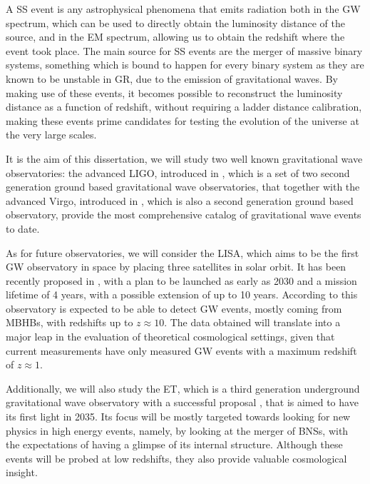 A \gls{SS} event is any astrophysical phenomena that emits radiation both in the \gls{GW} spectrum, which can be used to directly obtain the luminosity distance of the source, and in the \gls{EM} spectrum, allowing us to obtain the redshift where the event took place. The main source for \gls{SS} events are the merger of massive binary systems, something which is bound to happen for every binary system as they are known to be unstable in \gls{GR}, due to the emission of gravitational waves. By making use of these events, it becomes possible to reconstruct the luminosity distance as a function of redshift, without requiring a ladder distance calibration, making these events prime candidates for testing the evolution of the universe at the very large scales.

It is the aim of this dissertation, we will study two well known gravitational wave observatories: the advanced \gls{LIGO}, introduced in \cite{advLIGO}, which is a set of two second generation ground based gravitational wave observatories, that together with the advanced Virgo, introduced in \cite{advVirgo}, which is also a second generation ground based observatory, provide the most comprehensive catalog of gravitational wave events to date.

As for future observatories, we will consider the \gls{LISA}, which aims to be the first \gls{GW} observatory in space by placing three satellites in solar orbit. It has been recently proposed in \cite{LISA-proposal}, with a plan to be launched as early as 2030 and a mission lifetime of 4 years, with a possible extension of up to 10 years. According to \cite{Baker2021} this observatory is expected to be able to detect \gls{GW} events, mostly coming from \glspl{MBHB}, with redshifts up to $z \approx 10$. The data obtained will translate into a major leap in the evaluation of theoretical cosmological settings, given that current measurements have only measured \gls{GW} events with a maximum redshift of $z \approx 1$.

Additionally, we will also study the \gls{ET}, which is a third generation underground gravitational wave observatory with a successful proposal \cite{Maggiore2020}, that is aimed to have its first light in 2035. Its focus will be mostly targeted towards looking for new physics in high energy events, namely, by looking at the merger of \glspl{BNS}, with the expectations of having a glimpse of its internal structure. Although these events will be probed at low redshifts, they also provide valuable cosmological insight.

